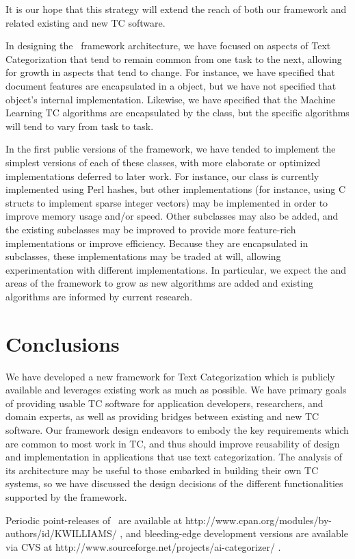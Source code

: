 \begin{singlespace}
It is our hope that this strategy will extend the reach of both our
framework and related existing and new TC software.

In designing the \aicat\ framework architecture, we have
focused on aspects of Text Categorization that tend to remain common
from one task to the next, allowing for growth in aspects that tend to
change.  For instance, we have specified that document features are
encapsulated in a  object, but we have not specified that
object's internal implementation.  Likewise, we have specified that
the Machine Learning TC algorithms are encapsulated by the 
class, but the specific algorithms will tend to vary from task to
task.

In the first public versions of the framework, we have tended to
implement the simplest versions of each of these classes, with more
elaborate or optimized implementations deferred to later work.  For
instance, our  class is currently implemented using Perl
hashes, but other implementations (for instance, using C structs to
implement sparse integer vectors) may be implemented in order to
improve memory usage and/or speed.  Other  subclasses may also
be added, and the existing subclasses may be improved to provide more
feature-rich implementations or improve efficiency.  Because they are
encapsulated in subclasses, these implementations may be traded at
will, allowing experimentation with different implementations.  In
particular, we expect the  and  areas of the
framework to grow as new algorithms are added and existing algorithms
are informed by current research.


\section{Conclusions}

We have developed a new framework for Text Categorization which is
publicly available and leverages existing work as much as possible.
We have primary goals of providing usable TC software for application
developers, researchers, and domain experts, as well as providing
bridges between existing and new TC software.  Our framework design
endeavors to embody the key requirements which are common to most work
in TC, and thus should improve reusability of design and
implementation in applications that use text categorization.  The
analysis of its architecture may be useful to those embarked in building
their own TC systems, so we have discussed the design decisions of the
different functionalities supported by the framework.

Periodic point-releases of \aicat\ are available at
http://www.cpan.org/modules/by-authors/id/KWILLIAMS/ , and
bleeding-edge development versions are available via CVS at
http://www.sourceforge.net/projects/ai-categorizer/ .

\end{singlespace}
